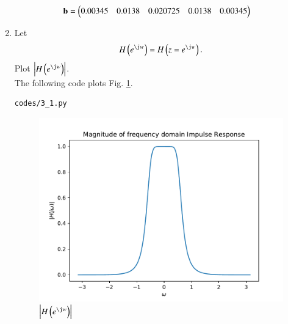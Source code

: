 \documentclass[journal,12pt,twocolumn]{IEEEtran}
\renewcommand\thesection{\arabic{section}}
\begin{document}
\begin{enumerate}[label=\thesection.\arabic*,ref=\thesection.\theenumi]
\begin{align}
\mathbf{b} &=\begin{pmatrix}0.00345&0.0138&0.020725&0.0138& 0.00345\end{pmatrix}
\end{align}
%
\item 
Let
\begin{equation}
H\brak{e^{\j w}} = H\brak{z = e^{\j w}}.
\end{equation}
Plot $\abs{H\brak{e^{\j w}}}$.
\\
\solution
The following code plots Fig. \ref{fig:3_1}.
\begin{lstlisting}
codes/3_1.py
\end{lstlisting}
\begin{figure}[!ht]
\centering
\includegraphics[width=\columnwidth]{./figs/3_1}
\caption{$\abs{H\brak{e^{\j w}}}$}
\label{fig:3_1}
\end{figure}
\end{enumerate}

\end{document}

